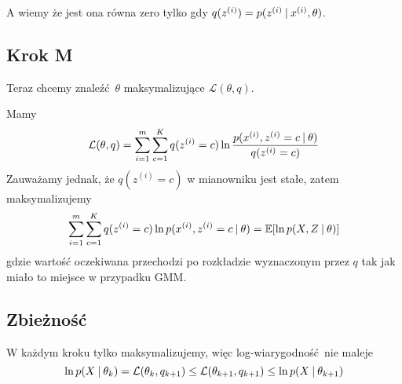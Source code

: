A wiemy że jest ona równa zero tylko gdy \( q(z^{(i)}) = p(z^{(i)} \:\vert\: x^{(i)}, \theta) \).

\subsection{Krok M}

Teraz chcemy znaleźć \( \theta \) maksymalizujące \( \mathcal{L}(\theta, q) \).

Mamy
\[
    \mathcal{L}(\theta, q) = \sum_{i=1}^m \sum_{c=1}^K q(z^{(i)} = c) \ln \frac{p(x^{(i)}, z^{(i)} = c \:\vert\: \theta)}{q(z^{(i)}=c)}
\]
Zauważamy jednak, że \( q(z^{(i)}=c) \) w mianowniku jest stałe, zatem maksymalizujemy
\[
    \sum_{i=1}^m \sum_{c=1}^K q(z^{(i)} = c) \ln p(x^{(i)}, z^{(i)} = c \given \theta) = \expected{\ln p(X, Z \given \theta)}
\]
gdzie wartość oczekiwana przechodzi po rozkładzie wyznaczonym przez \( q \) tak jak miało to miejsce w przypadku GMM.

\subsection{Zbieżność}

W każdym kroku tylko maksymalizujemy, więc log-wiarygodność nie maleje
\[
    \ln p(X \:\vert\: \theta_k) = \mathcal{L}(\theta_k, q_{k + 1}) \leq \mathcal{L}(\theta_{k+1}, q_{k+1}) \leq \ln p(X \:\vert\: \theta_{k + 1})
\]